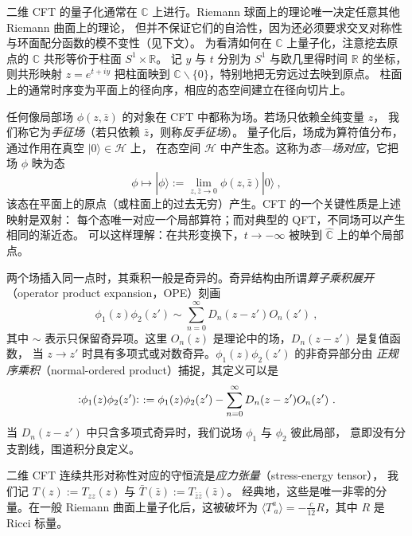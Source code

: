 \documentclass[11pt,a4paper,fontset=windows]{ctexart}
\numberwithin{equation}{section}
\newcommand{\CC}{\mathbb{C}}
\newcommand{\RR}{\mathbb{R}}
\newcommand{\RS}{\widehat{\CC}}
\newcommand{\normord}[1]{\vcentcolon\mathrel{#1}\vcentcolon}
\begin{document}
二维 CFT 的量子化通常在 $\CC$ 上进行。Riemann 球面上的理论唯一决定任意其他 Riemann 曲面上的理论，
但并不保证它们的自洽性，因为还必须要求交叉对称性与环面配分函数的模不变性（见下文）。
为看清如何在 $\CC$ 上量子化，注意挖去原点的 $\CC$ 共形等价于柱面 $S^1\times\RR$。
记 $y$ 与 $t$ 分别为 $S^1$ 与欧几里得时间 $\RR$ 的坐标，则共形映射 $z= e^{t+iy}$
把柱面映到 $\CC\backslash\{0\}$，特别地把无穷远过去映到原点。
柱面上的通常时序变为平面上的径向序，相应的态空间建立在径向切片上。

任何像局部场 $\phi(z,\bar{z})$ 的对象在 CFT 中都称为场。若场只依赖全纯变量 $z$，
我们称它为\emph{手征场}（若只依赖 $\bar{z}$，则称\emph{反手征场}）。
量子化后，场成为算符值分布，通过作用在真空 $|0\rangle\in\mathcal{H}$ 上，
在态空间 $\mathcal{H}$ 中产生态。这称为\emph{态—场对应}，它把场 $\phi$ 映为态
\begin{equation}
\phi\mapsto|\phi\rangle:=\lim_{z,\bar{z}\rightarrow0}\phi(z,\bar{z})|0\rangle~,
\end{equation}
该态在平面上的原点（或柱面上的过去无穷）产生。CFT 的一个关键性质是上述映射是双射：
每个态唯一对应一个局部算符；而对典型的 QFT，不同场可以产生相同的渐近态。
可以这样理解：在共形变换下，$t\rightarrow-\infty$ 被映到 $\RS$ 上的单个局部点。

两个场插入同一点时，其乘积一般是奇异的。奇异结构由所谓\emph{算子乘积展开}
（operator product expansion，OPE）刻画
\begin{equation}
\phi_1(z)\phi_2(z')\sim\sum_{n=0}^\infty D_n(z-z') O_n(z')~,
\end{equation}
其中 $\sim$ 表示只保留奇异项。这里 $O_n(z)$ 是理论中的场，$D_n(z-z')$ 是复值函数，
当 $z\to z'$ 时具有多项式或对数奇异。$\phi_1(z)\phi_2(z')$ 的非奇异部分由
\emph{正规序乘积}（normal-ordered product）捕捉，其定义可以是
\begin{equation}
\normord{\phi_1(z)\phi_2(z')}~:=\phi_1(z)\phi_2(z')-\sum_{n=0}^\infty D_n(z-z') O_n(z')~.
\end{equation}
当 $D_n(z-z')$ 中只含多项式奇异时，我们说场 $\phi_1$ 与 $\phi_2$ 彼此局部，
意即没有分支割线，围道积分良定义。


二维 CFT 连续共形对称性对应的守恒流是\emph{应力张量}（stress-energy tensor），
我们记 $T(z):=T_{zz}(z)$ 与 $\bar{T}(\bar{z}):=T_{\bar{z}\bar{z}}(\bar{z})$。
经典地，这些是唯一非零的分量。在一般 Riemann 曲面上量子化后，这被破坏为
$\langle T^a_{~a}\rangle=-\frac{c}{12}R$，其中 $R$ 是 Ricci 标量。
\end{document}
